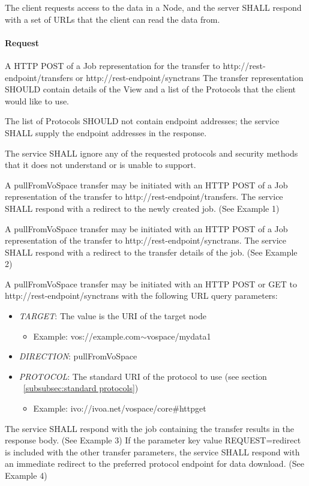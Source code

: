 \documentclass[11pt,a4paper]{ivoa}
\begin{document}
The client requests access to the data in a Node, and the server SHALL respond with a set of URLs that the client can read the data from.

\paragraph{Request}
A HTTP POST of a Job representation for the transfer to http://rest-endpoint/transfers or http://rest-endpoint/synctrans
The transfer representation SHOULD contain details of the View and a list of the Protocols that the client would like to use.

The list of Protocols SHOULD not contain endpoint addresses; the service SHALL supply the endpoint addresses in the response.

The service SHALL ignore any of the requested protocols and security methods that it does not understand or is unable to support.

A pullFromVoSpace transfer may be initiated with an HTTP POST of a Job representation of the transfer to http://rest-endpoint/transfers. The service SHALL respond with a redirect to the newly created job.  (See Example 1)

A pullFromVoSpace transfer may be initiated with an HTTP POST of a Job representation of the transfer to http://rest-endpoint/synctrans. The service SHALL respond with a redirect to the transfer details of the job.  (See Example 2)

A pullFromVoSpace transfer may be initiated with an HTTP POST or GET to http://rest-endpoint/synctrans with the following URL query parameters:
\begin{itemize}
    \item \emph{TARGET}: The value is the URI of the target node
        \begin{itemize}
           \item Example:  vos://example.com$\mathtt{\sim}$vospace/mydata1
        \end {itemize}
    \item \emph{DIRECTION}: pullFromVoSpace
    \item \emph{PROTOCOL}: The standard URI of the protocol to use (see section ~\ref{subsubsec:standard protocols})
        \begin{itemize}
           \item Example: ivo://ivoa.net/vospace/core\#httpget
        \end {itemize}
\end{itemize}
The service SHALL respond with the job containing the transfer results in the response body.  (See Example 3)
If the parameter key value REQUEST=redirect is included with the other transfer parameters, the service SHALL respond with an immediate redirect to the preferred protocol endpoint for data download.  (See Example 4)
\end{document}
